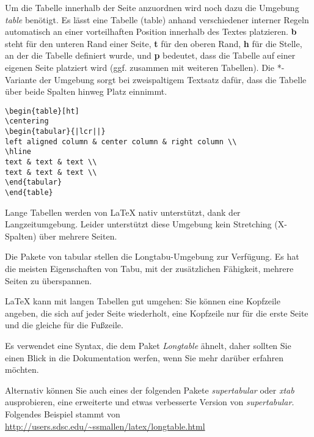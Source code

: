 Um die Tabelle innerhalb der Seite anzuordnen wird noch dazu die Umgebung \emph{table} benötigt. Es lässt eine Tabelle (table) anhand verschiedener interner Regeln automatisch an einer vorteilhaften Position innerhalb des Textes platzieren. \textbf{b} steht für den unteren Rand einer Seite, \textbf{t} für den oberen Rand, \textbf{h} für die Stelle, an der die Tabelle definiert wurde, und \textbf{p} bedeutet, dass die Tabelle auf einer eigenen Seite platziert wird (ggf. zusammen mit weiteren Tabellen). Die *-Variante der Umgebung sorgt bei zweispaltigem Textsatz dafür, dass die Tabelle über beide Spalten hinweg Platz einnimmt.
\newpage
\begin{lstlisting}[style=LaTeX]
\begin{table}[ht]
\centering
\begin{tabular}{|lcr||}
left aligned column & center column & right column \\
\hline
text & text & text \\
text & text & text \\
\end{tabular}
\end{table}
\end{lstlisting}

Lange Tabellen werden von LaTeX nativ unterstützt, dank der Langzeitumgebung. Leider unterstützt diese Umgebung kein Stretching (X-Spalten) über mehrere Seiten.

Die Pakete von tabular stellen die Longtabu-Umgebung zur Verfügung. Es hat die meisten Eigenschaften von Tabu, mit der zusätzlichen Fähigkeit, mehrere Seiten zu überspannen.

LaTeX kann mit langen Tabellen gut umgehen: Sie können eine Kopfzeile angeben, die sich auf jeder Seite wiederholt, eine Kopfzeile nur für die erste Seite und die gleiche für die Fußzeile.

Es verwendet eine Syntax, die dem Paket \emph{Longtable} ähnelt, daher sollten Sie einen Blick in die Dokumentation werfen, wenn Sie mehr darüber erfahren möchten.

Alternativ können Sie auch eines der folgenden Pakete \emph{supertabular} oder \emph{xtab} ausprobieren, eine erweiterte und etwas verbesserte Version von \emph{supertabular}.
Folgendes Beispiel stammt von \url{http://users.sdsc.edu/~ssmallen/latex/longtable.html}

